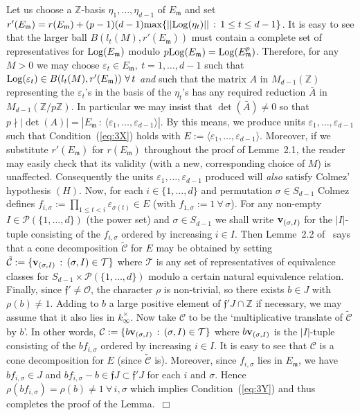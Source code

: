 \documentclass[12pt]{article}
\newcounter{rem}[section]%
\newcommand{\bbZ}{\ensuremath{\mathbb{Z}}}
\newcommand{\bv}{\ensuremath{{\bf v}}}
\newcommand{\cC}{\ensuremath{\mathcal{C}}}
\newcommand{\cO}{\ensuremath{\mathcal{O}}}
\newcommand{\cP}{\ensuremath{\mathcal{P}}}
\newcommand{\cT}{\ensuremath{\mathcal{T}}}
\newcommand{\ePf}{\hspace*{\fill}~$\Box$\vertsp\par}%
\newcommand{\ff}{\ensuremath{\mathfrak{f}}}
\newcommand{\fm}{\ensuremath{\mathfrak{m}}}
\newcommand{\ndiv}{\nmid}
\newcommand{\refeq}[1]{~(\ref{eq:#1})}
\newcommand{\rem}{\refstepcounter{rem}\noindent{\sc Remark \therem}}%
\renewcommand{\therem}{\thesection.\arabic{rem}}
\newcommand{\vertsp}{\vspace{1ex}}
\newcommand{\uinf}{\ensuremath{{\underline{\infty}}}}
\begin{document}
Let us choose a  $\bbZ$-basis $\eta_1,\ldots,\eta_{d-1}$ of $E_\fm$
and set
$r'(E_\fm)=r(E_\fm)+(p-1)(d-1){\rm max}\{||{\rm Log}(\eta_t)||\,:\,1\leq t\leq d-1\}$.
It is easy to see that the larger ball $B(l_t(M),r'(E_\fm))$ must contain a
complete set of representatives for ${\rm Log}(E_\fm)$ modulo
$p{\rm Log}(E_\fm)={\rm Log}(E_\fm^p)$.
Therefore, for any $M>0$ we may choose $\varepsilon_t\in E_\fm,\ t=1,\ldots,d-1$
such that ${\rm Log}(\varepsilon_t)\in B(l_t(M),r'(E_\fm))\ \forall\, t$
\emph{and} such that the matrix $A$ in $M_{d-1}(\bbZ)$ representing the $\varepsilon_t$'s
in the basis of the $\eta_t$'s has any required reduction $\bar{A}$
in $M_{d-1}(\bbZ/p\bbZ)$.
In particular we may insist that $\det(\bar{A})\neq 0$ so that
$p\ndiv |\det(A)|=|E_\fm\,:\,\langle\varepsilon_1,\ldots,\varepsilon_{d-1}\rangle|$.
By this means, we produce units $\varepsilon_1,\ldots,\varepsilon_{d-1}$
such that Condition\refeq{3X} holds with
$E:=\langle\varepsilon_1,\ldots,\varepsilon_{d-1}\rangle$. Moreover, if we substitute
$r'(E_\fm)$ for $r(E_\fm)$ throughout the proof of Lemme~2.1,
the reader may easily check that
its validity (with a new, corresponding choice of $M$) is unaffected.
Consequently the units $\varepsilon_1,\ldots,\varepsilon_{d-1}$ produced will
\emph{also} satisfy  Colmez' hypothesis $(H)$.
Now, for each $i\in\{1,\ldots,d\}$ and permutation $\sigma\in S_{d-1}$ Colmez defines
$f_{i,\sigma}:=\prod_{1\leq t<i}\varepsilon_{\sigma(t)}\in E$
(with $f_{1,\sigma}:=1\ \forall\,\sigma$). For any non-empty
$I\in\cP(\{1,\ldots,d\})$
(the power set) and $\sigma\in S_{d-1}$ we shall write $\bv_{(\sigma, I)}$
for the $|I|$-tuple consisting of the $f_{i,\sigma}$ ordered by increasing $i\in I$.
Then Lemme~2.2 of~\cite{Colm} says that a cone decomposition
$\tilde{\cC}$ for $E$ may be obtained by setting
$\tilde{\cC}:=\{\bv_{(\sigma, I)}\,:\,(\sigma, I)\in\cT\}$ where
$\cT$ is any set of representatives of equivalence classes for
$S_{d-1}\times \cP(\{1,\ldots,d\})$ modulo
a certain natural equivalence relation.
Finally, since $\ff'\neq \cO$, the character $\rho$ is
non-trivial, so there exists $b\in J$ with $\rho(b)\neq 1$.
Adding to $b$ a large positive element of $\ff' J\cap \bbZ$ if necessary,
we may assume that it also lies in $k^\times_\uinf$. Now
take $\cC$ to be the `multiplicative translate of $\tilde{\cC}$ by $b$'. In other words,
$\cC:=\{b\bv_{(\sigma, I)}\,:\,(\sigma, I)\in\cT\}$
where $b\bv_{(\sigma, I)}$ is the $|I|$-tuple consisting of the
$bf_{i,\sigma}$ ordered by increasing $i\in I$.
It is easy to see that $\cC$ is a cone decomposition
for $E$ (since $\tilde{\cC}$ is). Moreover, since $f_{i,\sigma}$ lies in
$E_\fm$, we have
$bf_{i,\sigma}\in J$ and
$bf_{i,\sigma}-b\in\ff J\subset\ff'J$ for each $i$ and $\sigma$.
Hence $\rho(bf_{i,\sigma})=\rho(b)\neq 1\ \forall\,i,\sigma$
which implies Condition\refeq{3Y} and thus completes the proof
of the Lemma.\ePf
\rem\label{rem:twobits}\
\end{document}
